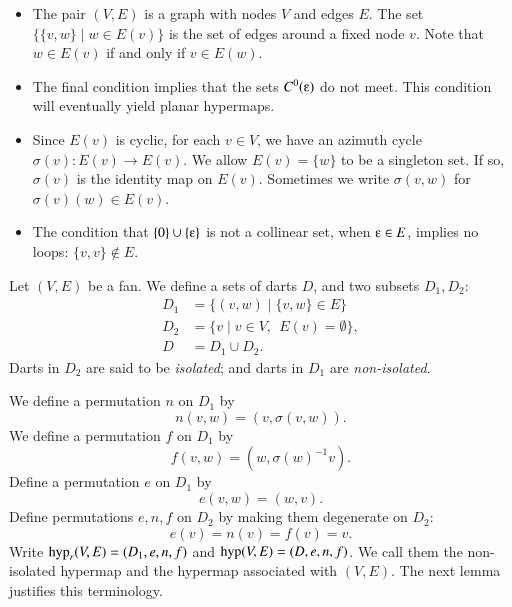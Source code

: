 \begin{remark}
\begin{itemize}
\item The pair $(V,E)$ is a graph with nodes $V$ and edges $E$.  The set
$\{\{v,w\}\mid w\in E(v)\}$ is the set of edges around a fixed node $v$.
Note that $w\in E(v)$ if and only if $v\in E(w)$.   
%
\item The final condition implies that the sets $C^0(\e)$
do not meet.   This condition will eventually yield planar
hypermaps.
%
\item
Since $E(v)$ is cyclic,
for each $v\in V$, we have an azimuth cycle $\sigma(v):E(v)\to E(v)$.
We allow $E(v) = \{w\}$ to be a
singleton set. If so,
$\sigma(v)$ is the identity map on $E(v)$.
%
Sometimes we write $\sigma(v,w)$ for $\sigma(v)(w)\in E(v)$.
%
\item 
The condition that $\{0\}\cup \{\e\}$ is not a collinear set, when $\e\in
E$, implies no loops: $\{v,v\}\not\in E$.
%
\end{itemize}
\end{remark}


Let $(V,E)$ be a fan.  We define a sets of darts $D$, and
two subsets $D_1,D_2$:
    $$
    \begin{array}{lll}
    D_1 &= \{(v,w)\mid \{v,w\}\in E\}\\
    D_2 &= \{v \mid v\in V,\ \ E(v) = \emptyset\},\\
    D   &= D_1\cup D_2.
    \end{array}
    $$
Darts in $D_2$ are said to be {\it isolated}; and darts in $D_1$ are {\it non-isolated}.
%

We define a permutation $n$ on $D_1$ by
    $$n(v,w) = (v,\sigma(v,w)).$$
We define a permutation $f$ on $D_1$ by
    $$
    f (v,w) = (w,\sigma(w)^{-1} v).
    $$
Define a permutation $e$ on $D_1$ by
    $$
    e (v,w) = (w,v).
    $$
Define permutations $e,n,f$ on $D_2$ by making them degenerate on $D_2$:
    $$
    e (v) = n(v) = f(v) = v.
    $$
Write ${\operatorname{hyp}}_r(V,E)=(D_1,e,n,f)$ and ${\operatorname{hyp}}(V,E)=(D,e,n,f)$.  We call them the non-isolated hypermap
and the hypermap associated with $(V,E)$.  The next
lemma justifies this terminology.



